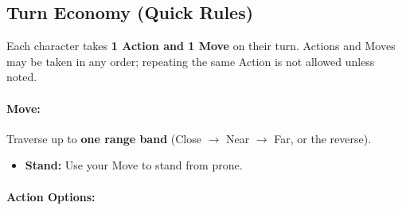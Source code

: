 \subsection{Turn Economy (Quick Rules)}
\label{sec:turn-economy}

Each character takes \textbf{1 Action and 1 Move} on their turn. Actions and Moves may be taken in any order; repeating the same Action is not allowed unless noted.

\paragraph{Move:}
Traverse up to \textbf{one range band} (Close $\rightarrow$ Near $\rightarrow$ Far, or the reverse).
\begin{itemize}
  \item \textbf{Stand:} Use your Move to stand from prone.
\end{itemize}

\paragraph{Action Options:}

